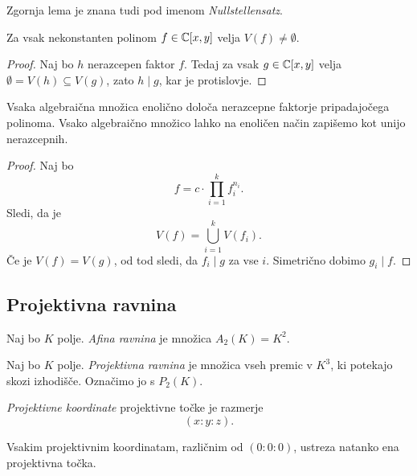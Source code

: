 \begin{opomba}
Zgornja lema je znana tudi pod imenom \emph{Nullstellensatz}.
\end{opomba}

\begin{posledica}
Za vsak nekonstanten polinom $f \in \mathbb{C}[x,y]$ velja
$V(f) \ne \emptyset$.
\end{posledica}

\begin{proof}
Naj bo $h$ nerazcepen faktor $f$. Tedaj za vsak $g \in \mathbb{C}[x,y]$
velja $\emptyset = V(h) \subseteq V(g)$, zato $h \mid g$, kar je
protislovje.
\end{proof}

\begin{posledica}
Vsaka algebraična množica enolično določa nerazcepne faktorje
pripadajočega polinoma. Vsako algebraično množico lahko na enoličen
način zapišemo kot unijo nerazcepnih.
\end{posledica}

\begin{proof}
Naj bo
\[
f = c \cdot \prod_{i=1}^k f_i^{n_i}.
\]
Sledi, da je
\[
V(f) = \bigcup_{i=1}^k V(f_i).
\]
Če je $V(f) = V(g)$, od tod sledi, da $f_i \mid g$ za vse $i$.
Simetrično dobimo $g_i \mid f$.
\end{proof}

\newpage

\subsection{Projektivna ravnina}


\begin{definicija}
Naj bo $K$ polje. \emph{Afina ravnina} je
množica $A_2(K) = K^2$.
\end{definicija}

\begin{definicija}
Naj bo $K$ polje.
\emph{Projektivna ravnina} je množica
vseh premic v $K^3$, ki potekajo skozi izhodišče. Označimo jo s
$P_2(K)$.
\end{definicija}

\begin{definicija}
\emph{Projektivne koordinate}
projektivne točke je razmerje
\[
(x : y : z).
\]
\end{definicija}

\begin{opomba}
Vsakim projektivnim koordinatam, različnim od $(0 : 0 : 0)$,
ustreza natanko ena projektivna točka.
\end{opomba}

